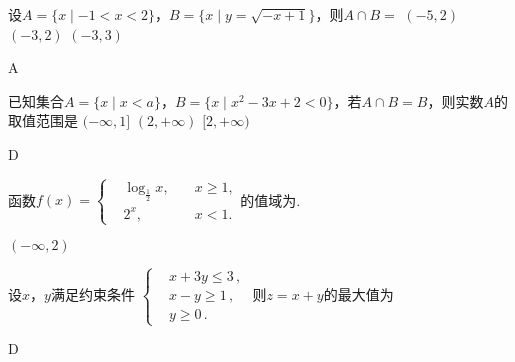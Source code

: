   \begin{exercise}
    \item %
      设$A=\{x\mid -1<x<2\}$，$B=\{x\mid y=\sqrt{-x+1}\}$，则$A\cap B=$\xz
      \xx{$(-1,1]$}
       {$(-5,2)$}
       {$(-3,2)$}
       {$(-3,3)$}
      \begin{answer}
        A
      \end{answer}
    \item %
      已知集合$A=\{x\mid x<a\}$，$B=\{x\mid x^2-3x+2<0\}$，若$A\cap B=B$，则实数$A$的取值范围是\xz
       {$(-\infty,1]$}
       {$(2,+\infty)$}
       {$[2,+\infty)$}
      \begin{answer}
        D
      \end{answer}
    \item %
      函数$f(x)=\left\{\begin{aligned}
      &\log_{\frac12}x,\quad &x\geqslant1,\\
      &2^x,\quad &x<1.
      \end{aligned}\right.$的值域为\tk.
      \begin{answer}
        $(-\infty,2)$
      \end{answer}
    \item %
      设$x$，$y$满足约束条件
      $\left\{\begin{aligned}
        &x+3y\leqslant3\,,\\
        &x-y\geqslant1\,,\\
        &y\geqslant0\,.
      \end{aligned}\right.$
      则$z=x+y$的最大值为\xz
      \begin{answer}
        D
      \end{answer}
    \item %

\end{exercise}
